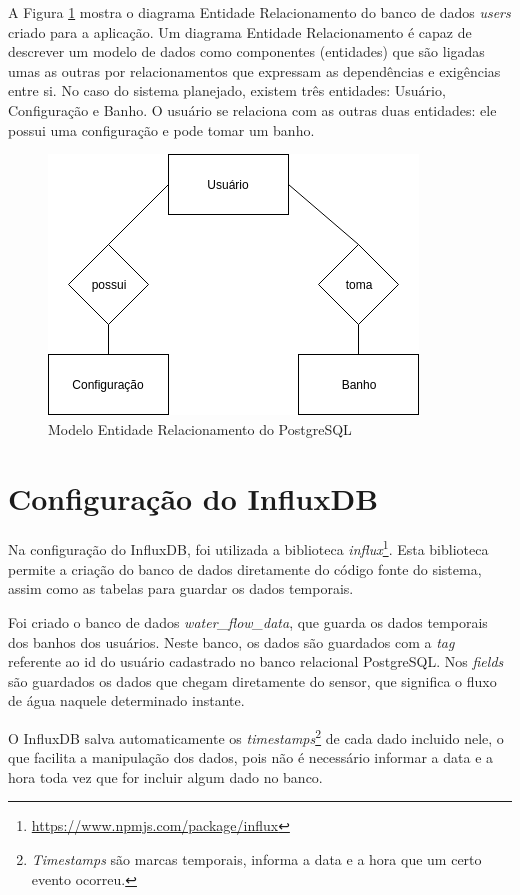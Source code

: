 A Figura \ref{fig:erpostgre} mostra o diagrama Entidade Relacionamento do banco de dados \textit{users} criado para a aplicação. Um diagrama Entidade Relacionamento é capaz de descrever um modelo de dados como componentes (entidades) que são ligadas umas as outras por relacionamentos que expressam as dependências e exigências entre si. No caso do sistema planejado, existem três entidades: Usuário, Configuração e Banho. O usuário se relaciona com as outras duas entidades: ele possui uma configuração e pode tomar um banho.

\begin{figure}[htbp]
	\centering
	\includegraphics[width=0.6\linewidth]{figuras/ERPostgre.png}
	\caption{Modelo Entidade Relacionamento do PostgreSQL}
	\label{fig:erpostgre}
\end{figure}


\section{Configuração do InfluxDB}

Na configuração do InfluxDB, foi utilizada a biblioteca \textit{influx}\footnote{\url{https://www.npmjs.com/package/influx}}. Esta biblioteca permite a criação do banco de dados diretamente do código fonte do sistema, assim como as tabelas para guardar os dados temporais.

Foi criado o banco de dados \textit{water\_flow\_data}, que guarda os dados temporais dos banhos dos usuários. Neste banco, os dados são guardados com a \textit{tag} referente ao id do usuário cadastrado no banco relacional PostgreSQL. Nos \textit{fields} são guardados os dados que chegam diretamente do sensor, que significa o fluxo de água naquele determinado instante.

O InfluxDB salva automaticamente os \textit{timestamps}\footnote{\textit{Timestamps} são marcas temporais, informa a data e a hora que um certo evento ocorreu.} de cada dado incluido nele, o que facilita a manipulação dos dados, pois não é necessário informar a data e a hora toda vez que for incluir algum dado no banco.

